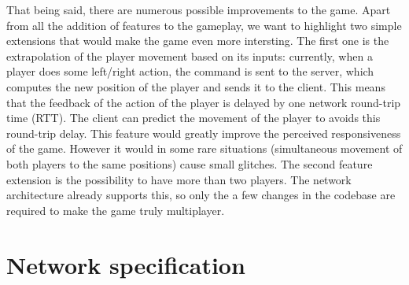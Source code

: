 \documentclass[english, DIV=13]{scrreprt}
\begin{document}
That being said, there are numerous possible improvements to the game. Apart
from all the addition of features to the gameplay, we want to highlight two
simple extensions that would make the game even more intersting.  The first one
is the extrapolation of the player movement based on its inputs: currently, when
a player does some left/right action, the command is sent to the server, which
computes the new position of the player and sends it to the client. This means
that the feedback of the action of the player is delayed by one network
round-trip time (RTT). The client can predict the movement of the player to
avoids this round-trip delay.  This feature would greatly improve the perceived
responsiveness of the game. However it would in some rare situations
(simultaneous movement of both players to the same positions) cause small
glitches.  The second feature extension is the possibility to have more than two
players. The network architecture already supports this, so only the a few
changes in the codebase are required to make the game truly multiplayer.

\appendix

\section{Network specification}
\end{document}
